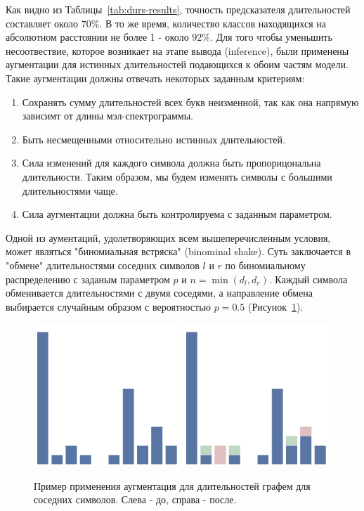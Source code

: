 Как видно из Таблицы~\ref{tab:durs-results}, точность предсказателя длительностей составляет около $70\%$. В то же время, количество классов находящихся на абсолютном расстоянии не более 1 - около $92\%$. Для того чтобы уменьшить несоотвествие, которое возникает на этапе вывода (inference), были применены аугментации для истинных длительностей подающихся к обоим частям модели. Такие аугментации должны отвечать некоторых заданным критериям:
\begin{enumerate}
    \item Сохранять сумму длительностей всех букв неизменной, так как она напрямую зависимт от длины мэл-спектрограммы.
    \item Быть несмещенными относительно истинных длительностей.
    \item Сила изменений для каждого символа должна быть пропорицональна длительности. Таким образом, мы будем изменять символы с большими длительностями чаще.
    \item Сила аугментации должна быть контролируема с заданным параметром.
\end{enumerate}

Одной из аументаций, удолетворяющих всем вышеперечисленным условия, может являться "биномиальная встряска" (binominal shake). Суть заключается в "обмене" длительностями соседних символов $l$ и $r$ по биномиальному распределению с заданым параметром $p$ и $n=\min(d_l, d_r)$. Каждый символа обменивается длительностями с двумя соседями, а направление обмена выбирается случайным образом с вероятностью $p=0.5$ (Рисунок~\ref{fig:aug}).

\begin{figure}[!ht]
\centering
\includegraphics[width=0.49\textwidth]{images/aug/before.png}
\vrule
\includegraphics[width=0.49\textwidth]{images/aug/after.png}
\caption{Пример применения аугментация для длительностей графем для соседних символов. Слева - до, справа - после.}
\label{fig:aug}
\end{figure}

